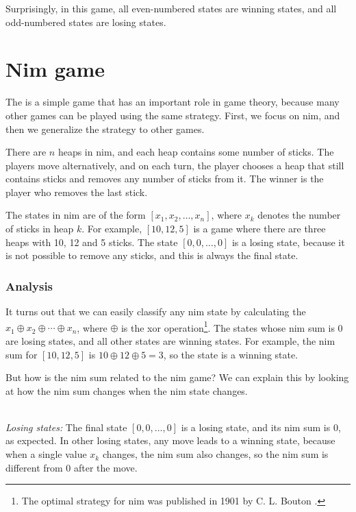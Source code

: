 Surprisingly, in this game,
all even-numbered states are winning states,
and all odd-numbered states are losing states.

\section{Nim game}


The  is a simple game that
has an important role in game theory,
because many other games can be played using
the same strategy.
First, we focus on nim,
and then we generalize the strategy
to other games.

There are $n$ heaps in nim,
and each heap contains some number of sticks.
The players move alternatively,
and on each turn, the player chooses
a heap that still contains sticks
and removes any number of sticks from it.
The winner is the player who removes the last stick.

The states in nim are of the form
$[x_1,x_2,\ldots,x_n]$,
where $x_k$ denotes the number of sticks in heap $k$.
For example, $[10,12,5]$ is a game where
there are three heaps with 10, 12 and 5 sticks.
The state $[0,0,\ldots,0]$ is a losing state,
because it is not possible to remove any sticks,
and this is always the final state.

\subsubsection{Analysis}

It turns out that we can easily classify
any nim state by calculating
the  $x_1 \oplus x_2 \oplus \cdots \oplus x_n$,
where $\oplus$ is the xor operation\footnote{The optimal strategy
for nim was published in 1901 by C. L. Bouton \cite{bou01}.}.
The states whose nim sum is 0 are losing states,
and all other states are winning states.
For example, the nim sum for
$[10,12,5]$ is $10 \oplus 12 \oplus 5 = 3$,
so the state is a winning state.

But how is the nim sum related to the nim game?
We can explain this by looking at how the nim
sum changes when the nim state changes.

~\\
\noindent
\textit{Losing states:}
The final state $[0,0,\ldots,0]$ is a losing state,
and its nim sum is 0, as expected.
In other losing states, any move leads to
a winning state, because when a single value $x_k$ changes,
the nim sum also changes, so the nim sum
is different from 0 after the move.

